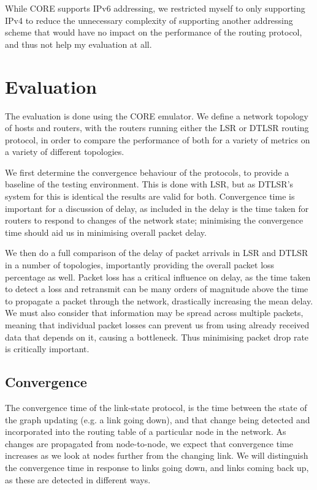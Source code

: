 \documentclass[withindex,glossary,openany]{cam-thesis}
\begin{document}
While CORE supports IPv6 addressing, we restricted myself to only supporting IPv4 to reduce the unnecessary complexity of supporting another addressing scheme that would have no impact on the performance of the routing protocol, and thus not help my evaluation at all.


\chapter{Evaluation} \label{chapter:evaluation}

The evaluation is done using the CORE emulator. We define a network topology of hosts and routers, with the routers running either the LSR or DTLSR routing protocol, in order to compare the performance of both for a variety of metrics on a variety of different topologies.

We first determine the convergence behaviour of the protocols, to provide a baseline of the testing environment. This is done with LSR, but as DTLSR's system for this is identical the results are valid for both. Convergence time is important for a discussion of delay, as included in the delay is the time taken for routers to respond to changes of the network state; minimising the convergence time should aid us in minimising overall packet delay.

We then do a full comparison of the delay of packet arrivals in LSR and DTLSR in a number of topologies, importantly providing the overall packet loss percentage as well. Packet loss has a critical influence on delay, as the time taken to detect a loss and retransmit can be many orders of magnitude above the time to propagate a packet through the network, drastically increasing the mean delay. We must also consider that information may be spread across multiple packets, meaning that individual packet losses can prevent us from using already received data that depends on it, causing a bottleneck. Thus minimising packet drop rate is critically important.

\section{Convergence}

The convergence time of the link-state protocol, is the time between the state of the graph updating (e.g. a link going down), and that change being detected and incorporated into the routing table of a particular node in the network. As changes are propagated from node-to-node, we expect that convergence time increases as we look at nodes further from the changing link. We will distinguish the convergence time in response to links going down, and links coming back up, as these are detected in different ways. 
\end{document}
